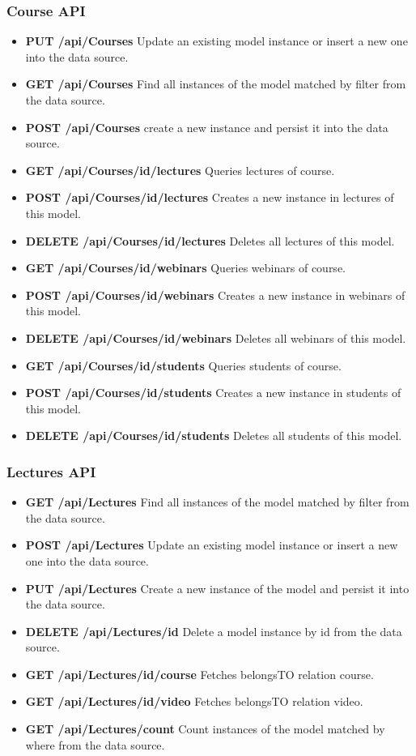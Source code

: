 \subsubsection{ Course API}
\begin{itemize}
\item \textbf{PUT /api/Courses} Update an existing model instance or insert a new one into the data source.
\item \textbf{GET /api/Courses} Find all instances of the model matched by filter from the data source.
\item \textbf{POST /api/Courses} create a new instance and persist it into the data source.
\item \textbf{GET /api/Courses/id/lectures} Queries lectures of course.
\item \textbf{POST /api/Courses/id/lectures} Creates a new instance in lectures of this model.
\item \textbf{DELETE /api/Courses/id/lectures} Deletes all lectures of this model.

\item \textbf{GET /api/Courses/id/webinars} Queries webinars of course.
\item \textbf{POST /api/Courses/id/webinars} Creates a new instance in webinars of this model.
\item \textbf{DELETE /api/Courses/id/webinars} Deletes all webinars of this model.

\item \textbf{GET /api/Courses/id/students} Queries students of course.
\item \textbf{POST /api/Courses/id/students} Creates a new instance in students of this model.
\item \textbf{DELETE /api/Courses/id/students} Deletes all students of this model.
\end{itemize}


\subsubsection{ Lectures API}
\begin{itemize}
\item \textbf{GET /api/Lectures} Find all instances of the model matched by filter from  the  data source.
\item \textbf{POST /api/Lectures} Update an existing model instance or insert a new one into the data  source.
\item \textbf{PUT /api/Lectures} Create a new instance of the model and persist it into the data   source.
\item \textbf{DELETE /api/Lectures/id} Delete a model instance by id from the data source.
\item \textbf{GET /api/Lectures/id/course} Fetches belongsTO relation course.

\item \textbf{GET /api/Lectures/id/video} Fetches belongsTO relation video.
\item \textbf{GET /api/Lectures/count} Count instances of the model matched by where from the data source.
\end{itemize}


